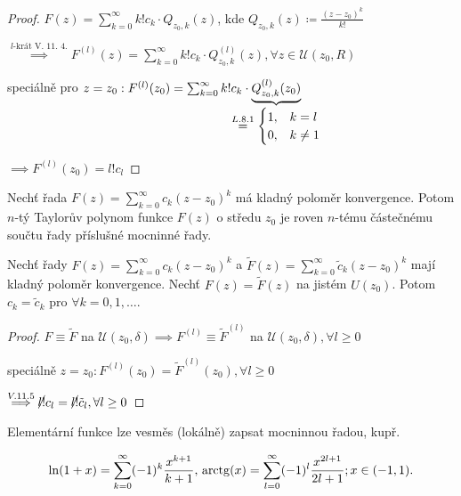 \begin{proof}
   $F(z) = \sum_{k=0}^\infty k! c_k \cdot Q_{z_0, k}(z)$, kde $Q_{z_0, k}(z) \coloneq \frac{(z-z_0)^k}{k!}$

   $\stackrel{l\text{-krát V. 11. 4.}}{\implies} F^{(l)}(z) = \sum_{k=0}^\infty k!c_k \cdot Q^{(l)}_{z_0, k}(z), \forall z \in \mathscr U(z_0, R)$

   speciálně pro $z=z_0: F^{(l)}(z_0)= \sum_{k=0}^\infty k!c_k \cdot \underbrace{Q^{(l)}_{z_0, k}(z_0)}_{\mathclap{\textstyle\stackrel{L. 8. 1}{=}\begin{cases} 1,&k=l \\ 0,&k\neq 1 \end{cases}}}$

   $\implies F^{(l)}(z_0) = l!c_l$
\end{proof}

\begin{poznamka}
  Nechť řada $F(z) = \sum_{k=0}^{\infty} c_k (z - z_0)^k$ má kladný poloměr konvergence. Potom $n$-tý Taylorův polynom funkce $F(z)$ o středu $z_0$ je roven $n$-tému částečnému součtu řady příslušné mocninné řady.
\end{poznamka}

\begin{veta}
  Nechť řady $F(z) = \sum_{k=0}^{\infty} c_k (z - z_0)^k$ a $\tilde{F}(z) = \sum_{k=0}^{\infty} \tilde{c}_k (z - z_0)^k$ mají kladný poloměr konvergence. Nechť $F(z) = \tilde{F}(z)$ na jistém $U(z_0)$. Potom $c_k = \tilde{c}_k$ pro $\forall k = 0, 1, \ldots$.
\end{veta}

\begin{proof}
  $F\equiv\tilde{F}$ na $\mathscr U(z_0, \delta)\implies F^{(l)} \equiv \tilde{F}^{(l)}$ na $\mathscr U(z_0, \delta), \forall l\geq 0$

  speciálně $z=z_0: F^{(l)}(z_0) = \tilde{F}^{(l)}(z_0), \forall l \geq 0$

  $\stackrel{V. 11. 5}{\implies} \cancel{l!}c_l = \cancel{l!}\tilde{c}_l, \forall l \geq 0$
\end{proof}

\begin{poznamka}
  Elementární funkce lze vesměs (lokálně) zapsat mocninnou řadou, kupř.

  $$\ln(1+x) = \sum_{k=0}^\infty (-1)^k \frac{x^{k+1}}{k+1},\, \operatorname{arctg}(x) = \sum_{l=0}^\infty (-1)^l \frac{x^{2l+1}}{2l+1}; x \in (-1, 1).$$
\end{poznamka}

